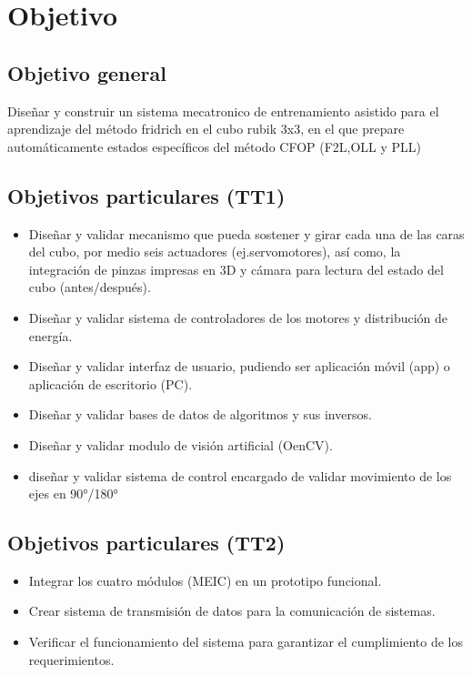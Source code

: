 \section{Objetivo}


\subsection{Objetivo general}
\label{Objetivo general}

Diseñar y construir un sistema mecatronico de entrenamiento asistido para el aprendizaje del método fridrich en el cubo rubik 3x3, en el que prepare automáticamente estados específicos del método CFOP (F2L,OLL y PLL) 

\subsection{Objetivos particulares (TT1)}
\begin{itemize}
    \item Diseñar y validar mecanismo que pueda sostener y girar cada una de las caras del cubo, por medio seis actuadores (ej.servomotores), así como, la integración de pinzas impresas en 3D y cámara para lectura del estado del cubo (antes/después).
    \item Diseñar y validar sistema de controladores de los motores y distribución de energía.  
    \item Diseñar y validar interfaz de usuario, pudiendo ser aplicación móvil (app) o aplicación de escritorio (PC).
    \item Diseñar y validar bases de datos de algoritmos y sus inversos.
    \item Diseñar y validar modulo de visión artificial (OenCV).
    \item diseñar y validar sistema de control encargado de validar movimiento de los ejes en 90°/180°
\end{itemize}

\subsection{Objetivos particulares (TT2)}
\begin{itemize}
    \item Integrar los cuatro módulos (MEIC) en un prototipo funcional.
    \item Crear sistema de transmisión de datos para la comunicación de sistemas.  
    \item Verificar el funcionamiento del sistema para garantizar el cumplimiento de los requerimientos.
\end{itemize}
    
